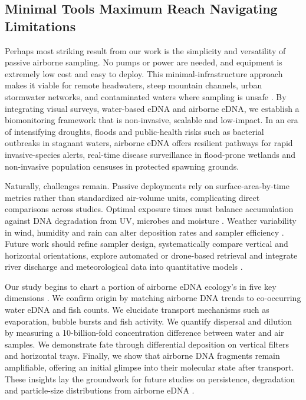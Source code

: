\documentclass{article}
\begin{document}
\subsection{\textbf{Minimal Tools Maximum Reach Navigating Limitations}}
Perhaps most striking result from our work is the simplicity and versatility of passive airborne sampling. No pumps or power are needed, and equipment is extremely low cost and easy to deploy. This minimal-infrastructure approach makes it viable for remote headwaters, steep mountain channels, urban stormwater networks, and contaminated waters where sampling is unsafe \cite{harrison2019,bagley2019}. By integrating visual surveys, water-based eDNA and airborne eDNA, we establish a biomonitoring framework that is non-invasive, scalable and low-impact. In an era of intensifying droughts, floods and public-health risks such as bacterial outbreaks in stagnant waters, airborne eDNA offers resilient pathways for rapid invasive-species alerts, real-time disease surveillance in flood-prone wetlands and non-invasive population censuses in protected spawning grounds.

Naturally, challenges remain. Passive deployments rely on surface-area-by-time metrics rather than standardized air-volume units, complicating direct comparisons across studies. Optimal exposure times must balance accumulation against DNA degradation from UV, microbes and moisture \cite{brandao-dias2023}. Weather variability in wind, humidity and rain can alter deposition rates and sampler efficiency \cite{johnson2023,johnson2024}. Future work should refine sampler design, systematically compare vertical and horizontal orientations, explore automated or drone-based retrieval and integrate river discharge and meteorological data into quantitative models \cite{galban2021,kirchgeorg2024,shogren2017,wood2021}.

Our study begins to chart a portion of airborne eDNA ecology's in five key dimensions \cite{johnson2024}. We confirm origin by matching airborne DNA trends to co-occurring water eDNA and fish counts. We elucidate transport mechanisms such as evaporation, bubble bursts and fish activity. We quantify dispersal and dilution by measuring a 10-billion-fold concentration difference between water and air samples. We demonstrate fate through differential deposition on vertical filters and horizontal trays. Finally, we show that airborne DNA fragments remain amplifiable, offering an initial glimpse into their molecular state after transport. These insights lay the groundwork for future studies on persistence, degradation and particle-size distributions from airborne eDNA \cite{brandao-dias2025a}.
\end{document}
